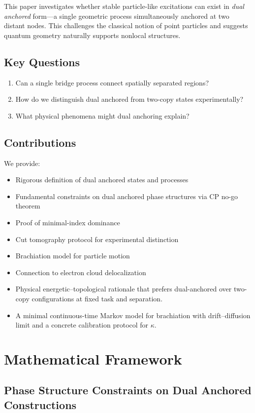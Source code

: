 \documentclass[11pt]{article}
\theoremstyle{plain}
\theoremstyle{definition}
\begin{document}
This paper investigates whether stable particle-like excitations can exist in \emph{dual anchored} form—a single geometric process simultaneously anchored at two distant nodes. This challenges the classical notion of point particles and suggests quantum geometry naturally supports nonlocal structures.

\subsection{Key Questions}
\begin{enumerate}
  \item Can a single bridge process connect spatially separated regions?
  \item How do we distinguish dual anchored from two-copy states experimentally?
  \item What physical phenomena might dual anchoring explain?
\end{enumerate}

\subsection{Contributions}
We provide:
\begin{itemize}
  \item Rigorous definition of dual anchored states and processes
  \item Fundamental constraints on dual anchored phase structures via CP no-go theorem
  \item Proof of minimal-index dominance
  \item Cut tomography protocol for experimental distinction
  \item Brachiation model for particle motion
  \item Connection to electron cloud delocalization
  \item Physical energetic--topological rationale that prefers dual-anchored over two-copy configurations at fixed task and separation.
  \item A minimal continuous-time Markov model for brachiation with drift--diffusion limit and a concrete calibration protocol for $\kappa$.

\end{itemize}

\section{Mathematical Framework}
\label{sec:framework}
\subsection{Phase Structure Constraints on Dual Anchored Constructions}\label{subsec:cp-nogo}
\end{document}
